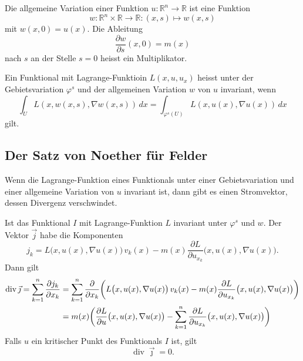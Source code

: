 \begin{definition}
Die allgemeine Variation einer Funktion
\(
u
\colon
\mathbb{R}^n\to \mathbb{R}
\)
ist eine Funktion
\[
w
\colon
\mathbb{R}^n \times\mathbb{R}
\to
\mathbb{R}
:
(x,s)
\mapsto
w(x,s)
\]
mit $w(x,0)=u(x)$.
Die Ableitung
\[
\frac{\partial w}{\partial s}(x,0) = m(x)
\]
nach $s$ an der Stelle $s=0$ heisst ein Multiplikator.
\end{definition}

\begin{definition}
Ein Funktional mit Lagrange-Funktioin
$L(x,u,u_x)$ heisst unter der Gebietsvariation $\varphi^s$ und
der allgemeinen Variation $w$ von $u$ invariant, wenn
\begin{equation}
\int_U
L(x,w(x,s),\nabla w(x,s))\,dx
=
\int_{\varphi^s(U)}
L(x,u(x),\nabla u(x))\,dx
\label{buch:symmetrien:felder:eqn:invarianz}
\end{equation}
gilt.
\end{definition}

%
%
\subsection{Der Satz von Noether für Felder}
Wenn die Lagrange-Funktion eines Funktionals unter einer Gebietsvariation
und einer allgemeine Variation von $u$ invariant ist, dann gibt es einen
Stromvektor, dessen Divergenz verschwindet.

\begin{satz}
Ist das Funktional $I$ mit Lagrange-Funktion $L$ invariant unter $\varphi^s$
und $w$.
Der Vektor $\vec{j}$ habe die Komponenten
\[
j_k
=
L\bigl(x,u(x),\nabla u(x)\bigr)\,v_k(x)
-
m(x)
\frac{\partial L}{\partial u_{x_k}}\bigl(x,u(x),\nabla u(x)\bigr).
\]
Dann gilt
\begin{align}
\operatorname{div}\vec{\jmath}
=
\sum_{k=1}^n \frac{\partial j_k}{\partial x_k}
&=
\sum_{k=1}^n
\frac{\partial }{\partial x_k}
\biggl(
L\bigl(x,u(x),\nabla u(x)\bigr)\,v_k(x)
-
m(x)
\frac{\partial L}{\partial u_{x_k}}
\bigl(x,u(x),\nabla u(x)\bigr)
\biggr)
\notag
\\
&=
m(x)\biggl(
\frac{\partial L}{\partial u}\bigl(x,u(x),\nabla u(x)\bigr)
-
\sum_{k=1}^n\frac{\partial L}{\partial u_{x_k}}\bigl(x,u(x),\nabla u(x)\bigr)
\biggr)
\label{buch:symmetrien:felder:eqn:rhs}
\end{align}
Falls $u$ ein kritischer Punkt des Funktionals $I$ ist, gilt
\[
\operatorname{div}\vec{\jmath}=0.
\]
\end{satz}

